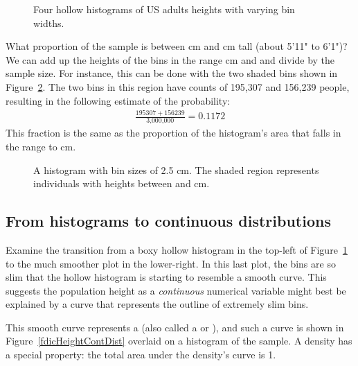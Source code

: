 \begin{figure}[ht]
  \centering
  \caption{Four hollow histograms of US adults heights
      with varying bin widths.}
  \label{fdicHistograms}
\end{figure}

\begin{examplewrap}
\begin{nexample}{What proportion of the sample is between  cm and  cm tall (about 5'11" to 6'1")?}\label{contDistProb}
We can add up the heights of the bins in the range  cm and  and divide by the sample size. For instance, this can be done with the two shaded bins shown in Figure~\ref{usHeightsHist180185}. The two bins in this region have counts of 195,307 and 156,239 people, resulting in the following estimate of the probability:
\begin{eqnarray*}
\frac{195307+156239}{\text{3,000,000}} = 0.1172
\end{eqnarray*}
This fraction is the same as the proportion of the histogram's area that falls in the range  to  cm.
\end{nexample}
\end{examplewrap}

\begin{figure}
  \centering
  \caption{A histogram with bin sizes of 2.5 cm.
      The shaded region represents individuals with
      heights between  and  cm.}
  \label{usHeightsHist180185}
\end{figure}


\subsection{From histograms to continuous distributions}

Examine the transition from a boxy hollow histogram in the top-left of Figure~\ref{fdicHistograms} to the much smoother plot in the lower-right. In this last plot, the bins are so slim that the hollow histogram is starting to resemble a smooth curve. This suggests the population height as a \emph{continuous} numerical variable might best be explained by a curve that represents the outline of extremely slim bins.

This smooth curve represents a  (also called a  or ), and such a curve is shown in Figure~\ref{fdicHeightContDist} overlaid on a histogram of the sample. A density has a special property: the total area under the density's curve is 1. 

